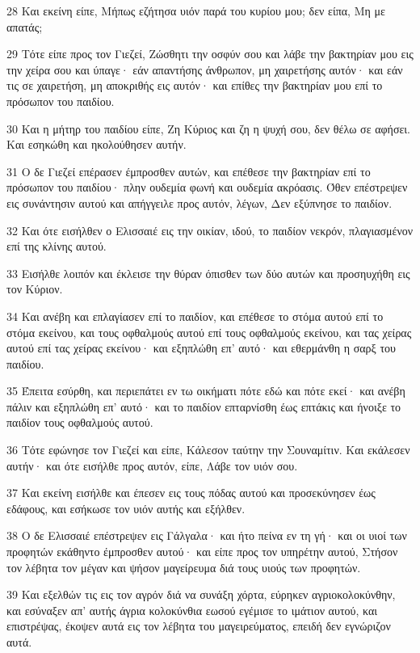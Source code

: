 \par 28 Και εκείνη είπε, Μήπως εζήτησα υιόν παρά του κυρίου μου; δεν είπα, Μη με απατάς;
\par 29 Τότε είπε προς τον Γιεζεί, Ζώσθητι την οσφύν σου και λάβε την βακτηρίαν μου εις την χείρα σου και ύπαγε· εάν απαντήσης άνθρωπον, μη χαιρετήσης αυτόν· και εάν τις σε χαιρετήση, μη αποκριθής εις αυτόν· και επίθες την βακτηρίαν μου επί το πρόσωπον του παιδίου.
\par 30 Και η μήτηρ του παιδίου είπε, Ζη Κύριος και ζη η ψυχή σου, δεν θέλω σε αφήσει. Και εσηκώθη και ηκολούθησεν αυτήν.
\par 31 Ο δε Γιεζεί επέρασεν έμπροσθεν αυτών, και επέθεσε την βακτηρίαν επί το πρόσωπον του παιδίου· πλην ουδεμία φωνή και ουδεμία ακρόασις. Όθεν επέστρεψεν εις συνάντησιν αυτού και απήγγειλε προς αυτόν, λέγων, Δεν εξύπνησε το παιδίον.
\par 32 Και ότε εισήλθεν ο Ελισσαιέ εις την οικίαν, ιδού, το παιδίον νεκρόν, πλαγιασμένον επί της κλίνης αυτού.
\par 33 Εισήλθε λοιπόν και έκλεισε την θύραν όπισθεν των δύο αυτών και προσηυχήθη εις τον Κύριον.
\par 34 Και ανέβη και επλαγίασεν επί το παιδίον, και επέθεσε το στόμα αυτού επί το στόμα εκείνου, και τους οφθαλμούς αυτού επί τους οφθαλμούς εκείνου, και τας χείρας αυτού επί τας χείρας εκείνου· και εξηπλώθη επ' αυτό· και εθερμάνθη η σαρξ του παιδίου.
\par 35 Έπειτα εσύρθη, και περιεπάτει εν τω οικήματι πότε εδώ και πότε εκεί· και ανέβη πάλιν και εξηπλώθη επ' αυτό· και το παιδίον επταρνίσθη έως επτάκις και ήνοιξε το παιδίον τους οφθαλμούς αυτού.
\par 36 Τότε εφώνησε τον Γιεζεί και είπε, Κάλεσον ταύτην την Σουναμίτιν. Και εκάλεσεν αυτήν· και ότε εισήλθε προς αυτόν, είπε, Λάβε τον υιόν σου.
\par 37 Και εκείνη εισήλθε και έπεσεν εις τους πόδας αυτού και προσεκύνησεν έως εδάφους, και εσήκωσε τον υιόν αυτής και εξήλθεν.
\par 38 Ο δε Ελισσαιέ επέστρεψεν εις Γάλγαλα· και ήτο πείνα εν τη γή· και οι υιοί των προφητών εκάθηντο έμπροσθεν αυτού· και είπε προς τον υπηρέτην αυτού, Στήσον τον λέβητα τον μέγαν και ψήσον μαγείρευμα διά τους υιούς των προφητών.
\par 39 Και εξελθών τις εις τον αγρόν διά να συνάξη χόρτα, εύρηκεν αγριοκολοκύνθην, και εσύναξεν απ' αυτής άγρια κολοκύνθια εωσού εγέμισε το ιμάτιον αυτού, και επιστρέψας, έκοψεν αυτά εις τον λέβητα του μαγειρεύματος, επειδή δεν εγνώριζον αυτά.
